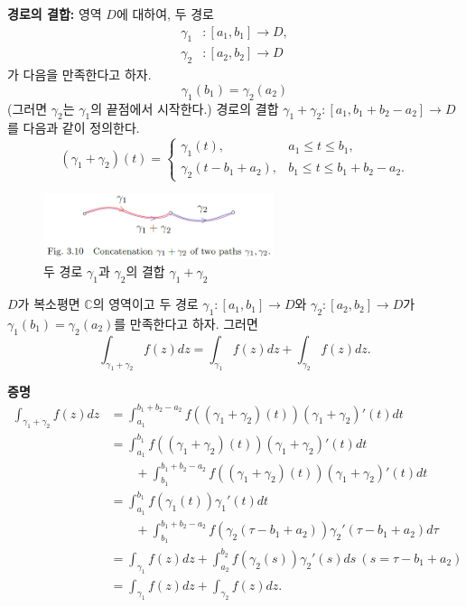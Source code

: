 {\bf  경로의 결합:}
영역 $D$에 대하여, 두 경로
\begin{align*}
\gamma_1 &: [a_1, b_1] \to D, \\
\gamma_2 &: [a_2, b_2] \to D
\end{align*}
가 다음을 만족한다고 하자.
\[
\gamma_1(b_1) = \gamma_2(a_2)
\]
(그러면 $\gamma_2$는 $\gamma_1$의 끝점에서 시작한다.)
경로의 결합 $\gamma_1+\gamma_2: [a_1, b_1+b_2-a_2] \to D$를
다음과 같이 정의한다.
\[
(\gamma_1+\gamma_2)(t) = \begin{cases}
\gamma_1(t), & a_1\le t\le b_1, \\
\gamma_2(t-b_1+a_2), & b_1 \le t \le b_1+b_2-a_2.
\end{cases}
\]

\begin{figure}[!h]
\begin{center}
\includegraphics[width=0.6\textwidth]{./SaltChapter/fig-3-10}
\end{center}
\caption{두 경로 $\gamma_1$과  $\gamma_2$의 결합 $\gamma_1 + \gamma_2$}
\label{fig-3-10}
\end{figure}

\begin{saltprop}{}{} \label{prop-3-3}
$D$가 복소평면 $\mathbb C$의 영역이고
두 경로 $\gamma_1: [a_1,b_1] \to D$와 $\gamma_2: [a_2,b_2] \to D$가 
$\gamma_1(b_1) = \gamma_2(a_2)$를 만족한다고 하자.
그러면
\[
\int_{\gamma_1+\gamma_2} f(z)dz 
=\int_{\gamma_1} f(z)dz + \int_{\gamma_2} f(z)dz.
\]
\end{saltprop}

{\bf 증명}
\begin{align*}
\int_{\gamma_1+\gamma_2} f(z)dz 
&= \int_{a_1}^{b_1+b_2-a_2} f((\gamma_1+\gamma_2)(t)) (\gamma_1+\gamma_2)'(t)dt\\
&= \int_{a_1}^{b_1} f((\gamma_1+\gamma_2)(t)) (\gamma_1+\gamma_2)'(t)dt\\
& \quad\quad 
+\int_{b_1}^{b_1+b_2-a_2} f((\gamma_1+\gamma_2)(t)) (\gamma_1+\gamma_2)'(t)dt\\
&= \int_{a_1}^{b_1} f(\gamma_1(t))\gamma_1'(t)dt \\
&\quad\quad 
+ \int_{b_1}^{b_1+b_2-a_2} f(\gamma_2(\tau-b_1+a_2))\gamma_2'(\tau-b_1+a_2)d\tau\\
&= \int_{\gamma_1} f(z)dz + \int_{a_2}^{b_2} f(\gamma_2(s)) \gamma_2'(s)ds 
\ (s=\tau-b_1+a_2) \\
&= \int_{\gamma_1} f(z)dz + \int_{\gamma_2} f(z)dz.
\end{align*}

